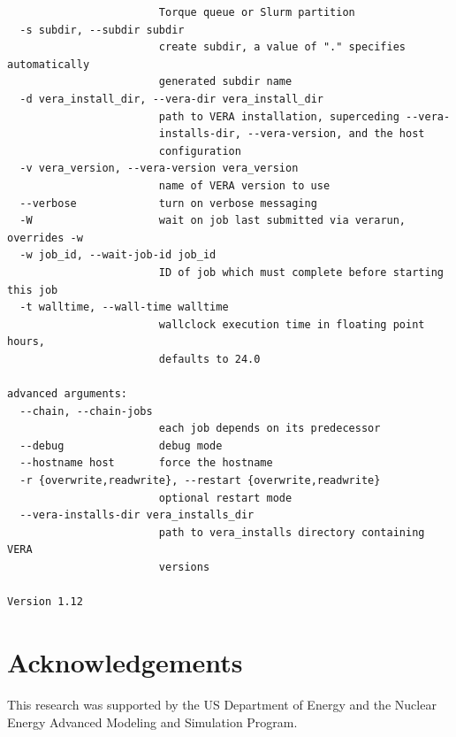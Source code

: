 \documentclass{vera-ornltm}
\begin{document}
\begin{verbatim}
                        Torque queue or Slurm partition
  -s subdir, --subdir subdir
                        create subdir, a value of "." specifies automatically
                        generated subdir name
  -d vera_install_dir, --vera-dir vera_install_dir
                        path to VERA installation, superceding --vera-
                        installs-dir, --vera-version, and the host
                        configuration
  -v vera_version, --vera-version vera_version
                        name of VERA version to use
  --verbose             turn on verbose messaging
  -W                    wait on job last submitted via verarun, overrides -w
  -w job_id, --wait-job-id job_id
                        ID of job which must complete before starting this job
  -t walltime, --wall-time walltime
                        wallclock execution time in floating point hours,
                        defaults to 24.0

advanced arguments:
  --chain, --chain-jobs
                        each job depends on its predecessor
  --debug               debug mode
  --hostname host       force the hostname
  -r {overwrite,readwrite}, --restart {overwrite,readwrite}
                        optional restart mode
  --vera-installs-dir vera_installs_dir
                        path to vera_installs directory containing VERA
                        versions

Version 1.12
\end{verbatim}

\section{Acknowledgements}

This research was supported by the US Department of Energy and the Nuclear Energy Advanced Modeling and Simulation Program.

\end{document}
